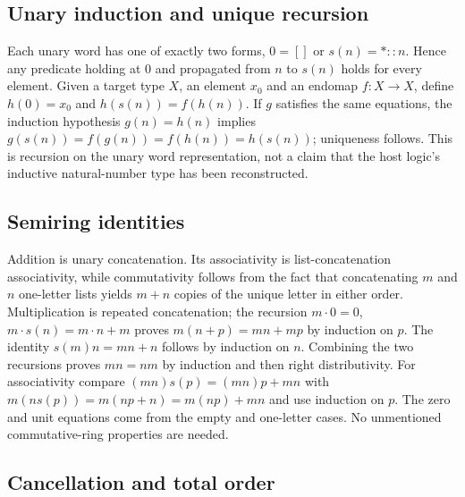 \subsection{Unary induction and unique recursion}\label{supp:4-1}
\par{}\par\smallskip

Each unary word has one of exactly two forms, $0=[]$ or $s(n)=\ast::n$. Hence any predicate holding at $0$ and propagated from $n$ to $s(n)$ holds for every element. Given a target type $X$, an element $x_0$ and an endomap $f:X\to X$, define $h(0)=x_0$ and $h(s(n))=f(h(n))$. If $g$ satisfies the same equations, the induction hypothesis $g(n)=h(n)$ implies $g(s(n))=f(g(n))=f(h(n))=h(s(n))$; uniqueness follows. This is recursion on the unary word representation, not a claim that the host logic's inductive natural-number type has been reconstructed.

\subsection{Semiring identities}\label{supp:4-2}
\par{}\par\smallskip

Addition is unary concatenation. Its associativity is list-concatenation associativity, while commutativity follows from the fact that concatenating $m$ and $n$ one-letter lists yields $m+n$ copies of the unique letter in either order. Multiplication is repeated concatenation; the recursion $m\cdot0=0$, $m\cdot s(n)=m\cdot n+m$ proves $m(n+p)=mn+mp$ by induction on $p$. The identity $s(m)n=mn+n$ follows by induction on $n$. Combining the two recursions proves $mn=nm$ by induction and then right distributivity. For associativity compare $(mn)s(p)=(mn)p+mn$ with $m(ns(p))=m(np+n)=m(np)+mn$ and use induction on $p$. The zero and unit equations come from the empty and one-letter cases. No unmentioned commutative-ring properties are needed.

\subsection{Cancellation and total order}\label{supp:4-3}
\par{}\par\smallskip

